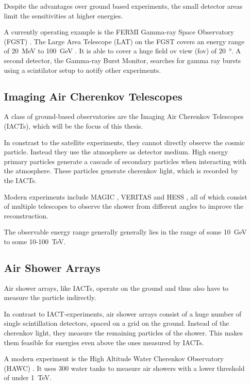 Despite the advantages over ground based experiments, the small detector areas 
limit the sensitivities at higher energies.

A currently operating example is the FERMI Gamma-ray Space Observatory (FGST) \cite{Atwood_2009}.
The Large Area Telescope (LAT) on 
the FGST covers an energy range of
\SI{20}{\mega\electronvolt} to \SI{100}{\giga\electronvolt} \cite{Atwood_2009}.
It is able to cover a huge field ov view (fov) of 
\SI{20}{\degree}. A second detector, the Gamma-ray Burst Monitor,
searches for gamma ray bursts using a scintilator setup to notify other experiments.

\subsection{Imaging Air Cherenkov Telescopes}
A class of ground-based observatories are the 
Imaging Air Cherenkov Telescopes (IACTs),
which will be the focus of this thesis.

In constrast to the satellite experiments, they cannot directly
observe the cosmic particle. Instead they use the atmosphere as detector medium.
High energy primary particles generate a cascade of secondary particles
when interacting with the atmosphere. These particles generate cherenkov
light, which is recorded by the IACTs.

Modern experiments include 
MAGIC \cite{ALEKSIC2012435},
VERITAS \cite{WEEKES2002221}
and HESS \cite{vincent2005hess},
all of which consist of multiple telescopes to observe the shower 
from different angles to improve the reconstruction.

The observable energy range generally generally lies in the range of
some \SI{10}{\giga\electronvolt} to some 10-\SI{100}{\tera\electronvolt}.

\subsection{Air Shower Arrays}
Air shower arrays, like IACTs, operate on the ground and thus also have 
to measure the particle indirectly.

In contrast to IACT-experiments, air shower arrays consist of a huge
number of single scintillation detectors, spaced on a grid on the ground.
Instead of the cherenkov light, they measure the
remaining particles of the shower. This makes them feasible
for energies even above the ones measured by IACTs.

A modern experiment is the High Altitude Water Cherenkov Observatory (HAWC) \cite{2015ICRC...34..966S}.
It uses \num{300} water tanks to measure air showers with a lower threshold
of under \SI{1}{\tera\electronvolt}.

